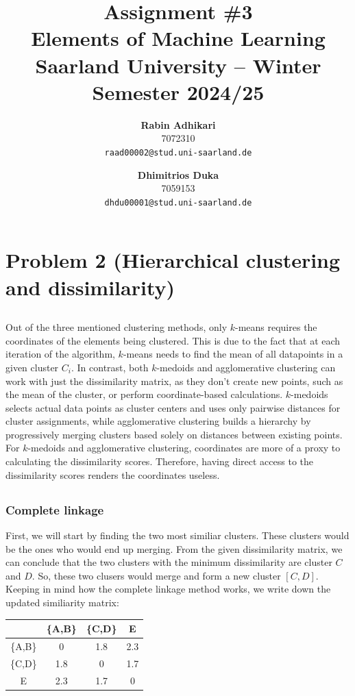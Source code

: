 \documentclass{article}
\title{Assignment \#3\\
  \vspace{2mm}
  \small{Elements of Machine Learning}
  \\
  \vspace{2mm}
  \small{Saarland University -- Winter Semester 2024/25}
}
\author{%
\textbf{Rabin Adhikari} \\
  7072310 \\
  \texttt{raad00002@stud.uni-saarland.de} \\
  \and
  \textbf{Dhimitrios Duka} \\
 7059153 \\
  \texttt{dhdu00001@stud.uni-saarland.de} \\
}
\begin{document}
\maketitle

\setcounter{section}{1}
\section{Problem 2 (Hierarchical clustering and dissimilarity)}
\subsection{}
Out of the three mentioned clustering methods, only $k$-means requires the coordinates of the elements being clustered. This is due to the fact that at each iteration of the algorithm, $k$-means needs to find the mean of all datapoints in a given cluster $C_i$. In contrast, both $k$-medoids and agglomerative clustering can work with just the dissimilarity matrix, as they don't create new points, such as the mean of the cluster, or perform coordinate-based calculations. $k$-medoids selects actual data points as cluster centers and uses only pairwise distances for cluster assignments, while agglomerative clustering builds a hierarchy by progressively merging clusters based solely on distances between existing points. For $k$-medoids and agglomerative clustering, coordinates are more of a proxy to calculating the dissimilarity scores. Therefore, having direct access to the dissimilarity scores renders the coordinates useless.

\subsection{}
\subsubsection{Complete linkage}
First, we will start by finding the two most similiar clusters. These clusters would be the ones who would end up merging. From the given dissimilarity matrix, we can conclude that the two clusters with the minimum dissimilarity are cluster $C$ and $D$. So, these two clusers would merge and form a new cluster $[C, D]$. Keeping in mind how the complete linkage method works, we write down the updated similiarity matrix:

\begin{center}
    \begin{tabular}{c|ccc}
          & \{A,B\} & \{C,D\} & E \\
    \hline
    \{A,B\} & 0     & 1.8   & 2.3 \\
    \{C,D\} & 1.8   & 0     & 1.7 \\
    E       & 2.3   & 1.7   & 0   \\
    \end{tabular}
\end{center}
\end{document}
